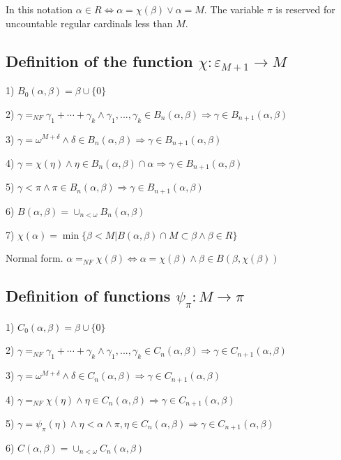 \documentclass[10pt]{article}
\begin{document}
In this notation \(\alpha\in R\Leftrightarrow\alpha=\chi(\beta)\vee\alpha=M\). The variable \(\pi\) is reserved for uncountable regular cardinals less than \(M\). 

\subsection{Definition of the function \(\chi:\varepsilon_{M+1}\rightarrow M\)}

1) \(B_0(\alpha,\beta)=\beta\cup\{0\}\)

2) \(\gamma=_{NF}\gamma_1+\cdots+\gamma_k\wedge\gamma_1,...,\gamma_k\in B_n(\alpha,\beta)\Rightarrow\gamma\in B_{n+1}(\alpha,\beta)\)

3) \(\gamma=\omega^{M+\delta}\wedge\delta\in B_n(\alpha,\beta)\Rightarrow\gamma\in B_{n+1}(\alpha,\beta)\)

4) \(\gamma=\chi(\eta)\wedge\eta\in B_n(\alpha,\beta)\cap\alpha \Rightarrow\gamma\in B_{n+1}(\alpha,\beta)\)

5) \(\gamma<\pi\wedge\pi\in B_n(\alpha,\beta) \Rightarrow\gamma\in B_{n+1}(\alpha,\beta)\)

6) \(B(\alpha,\beta)=\cup_{n<\omega}B_n(\alpha,\beta)\)

7) \(\chi(\alpha)=\min\{\beta<M|B(\alpha,\beta)\cap M\subset\beta\wedge\beta\in R\}\)

Normal form. \(\alpha=_{NF}\chi(\beta)\Leftrightarrow\alpha=\chi(\beta)\wedge\beta\in B(\beta,\chi(\beta))\)

\subsection{Definition of functions \(\psi_\pi:M\rightarrow \pi\)}

1) \(C_0(\alpha,\beta)=\beta\cup\{0\}\)

2) \(\gamma=_{NF}\gamma_1+\cdots+\gamma_k\wedge\gamma_1,...,\gamma_k \in C_n(\alpha,\beta)\Rightarrow\gamma\in C_{n+1}(\alpha,\beta)\)

3) \(\gamma=\omega^{M+\delta}\wedge\delta\in C_n(\alpha,\beta)\Rightarrow\gamma\in C_{n+1}(\alpha,\beta)\)

4) \(\gamma=_{NF}\chi(\eta)\wedge\eta\in C_n(\alpha,\beta) \Rightarrow\gamma\in C_{n+1}(\alpha,\beta)\)

5) \(\gamma=\psi_\pi(\eta)\wedge\eta<\alpha\wedge\pi,\eta\in C_n(\alpha,\beta)\Rightarrow\gamma\in C_{n+1}(\alpha,\beta)\)

6) \(C(\alpha,\beta)=\cup_{n<\omega}C_n(\alpha,\beta)\)
\end{document}
